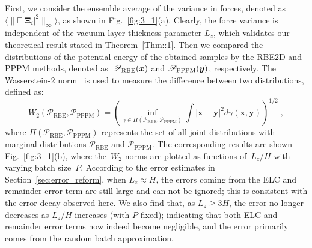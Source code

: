 First, we consider the ensemble average of the variance in forces, denoted as $\langle\|\mathbb{E}|\bm{\Xi}_i|^2\|_{\infty}\rangle$, as shown in Fig.~\ref{fig:3_1}(a). 
Clearly, the force variance is independent   {of} the vacuum layer thickness parameter $L_z$, which validates our theoretical result stated in Theorem~\ref{Thm::1}. 
 {Then we compared the distributions of the potential energy of the obtained samples by the RBE2D and PPPM methods, denoted as~$\mathscr{P}_{\text{RBE}}(\boldsymbol{x})$ and $\mathscr{P}_{\text{PPPM}}(\boldsymbol{y})$, respectively.
The Wasserstein-2 norm~\cite{santambrogio2015optimal, kolbe_2024_10912241} is used to measure the difference between two distributions, defined as:}
\begin{equation}\label{eq::W2}
    W_2(\mathscr{P}_{\text{RBE}}, \mathscr{P}_{\text{PPPM}})=\left(\inf _{\gamma \in \Pi(\mathscr{P}_{\text{RBE}}, \mathscr{P}_{\text{PPPM}})} \int|\bm{x} - \bm{y}|^2 d  {\gamma(\bm{x},\bm{y})}\right)^{1 / 2}\;,
\end{equation}
where $\Pi(\mathscr{P}_{\text{RBE}}, \mathscr{P}_{\text{PPPM}})$ represents the set of all joint distributions with marginal distributions $\mathscr{P}_{\text{RBE}}$ and $\mathscr{P}_{\text{PPPM}}$.
The corresponding results are shown Fig.~\ref{fig:3_1}(b), where the~$W_2$ norms are   {plotted} as functions of~$L_z / H$ with   {varying} batch size~$P$.
According to the error estimates in Section~\ref{sec:error_reform}, when $L_z\approx H$, the errors coming from the ELC and remainder error term are still large and can not be ignored;   {this} is consistent with the error decay observed here. 
We also find that, as $L_z\geq 3H$, the error no longer decreases as $L_z/H$ increases (with $P$ fixed); indicating that
both ELC and remainder error terms now indeed become negligible, and the error primarily comes from the random batch approximation. 


